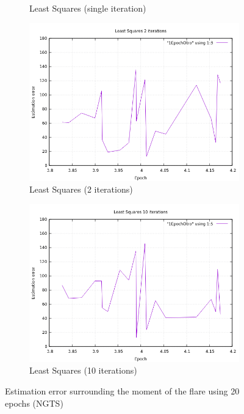 \begin{figure}[!htb]
\begin{subfigure}[b]{0.5\textwidth}
		\caption{Least Squares (single iteration)}
	\end{subfigure}
	\hfill
	\begin{subfigure}[b]{0.5\textwidth}
		\includegraphics[width=\linewidth]{images/resultsStellar/20Epochs1Epoch/1EpochOtroLS2.png}
		\caption{Least Squares (2 iterations)}
	\end{subfigure}
	\hfill
	\begin{subfigure}[b]{0.5\textwidth}
		\includegraphics[width=\linewidth]{images/resultsStellar/20Epochs1Epoch/1EpochOtroLS10.png}
		\caption{Least Squares (10 iterations)}
	\end{subfigure}
	\caption{Estimation error surrounding the moment of the flare using 20 epochs (NGTS)}
	\label{fig:UL1Epoch20}
\end{figure}

